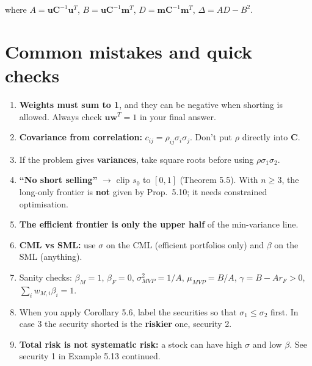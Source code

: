 \documentclass[titlepage,11pt,a4paper]{article}
\newcommand{\vw}{\boldsymbol{w}}
\newcommand{\vm}{\boldsymbol{m}}
\newcommand{\vu}{\boldsymbol{u}}
\newcommand{\vC}{\boldsymbol{C}}
\newcommand{\T}{^{T}}
\newcommand{\Ci}{\vC^{-1}}
\begin{document}
\noindent where $A=\vu\Ci\vu\T$, $B=\vu\Ci\vm\T$, $D=\vm\Ci\vm\T$, $\Delta=AD-B^2$.

\section{Common mistakes and quick checks}
\begin{enumerate}
  \item \textbf{Weights must sum to 1}, and they can be negative when shorting is allowed. Always check $\vu\vw\T=1$ in your final answer.
  \item \textbf{Covariance from correlation:} $c_{ij}=\rho_{ij}\sigma_i\sigma_j$. Don't put $\rho$ directly into $\vC$.
  \item If the problem gives \textbf{variances}, take square roots before using $\rho\sigma_1\sigma_2$.
  \item \textbf{``No short selling''} $\to$ clip $s_0$ to $[0,1]$ (Theorem 5.5). With $n\ge3$, the long-only frontier is \textbf{not} given by Prop.\ 5.10; it needs constrained optimisation.
  \item \textbf{The efficient frontier is only the upper half} of the min-variance line.
  \item \textbf{CML vs SML:} use $\sigma$ on the CML (efficient portfolios only) and $\beta$ on the SML (anything).
  \item Sanity checks: $\beta_M=1$, $\beta_F=0$, $\sigma^2_{MVP}=1/A$, $\mu_{MVP}=B/A$, $\gamma=B-Ar_F>0$, $\sum_iw_{M,i}\beta_i=1$.
  \item When you apply Corollary 5.6, label the securities so that $\sigma_1\le\sigma_2$ first. In case 3 the security shorted is the \textbf{riskier} one, security 2.
  \item \textbf{Total risk is not systematic risk:} a stock can have high $\sigma$ and low $\beta$. See security 1 in Example 5.13 continued.
\end{enumerate}
\end{document}
